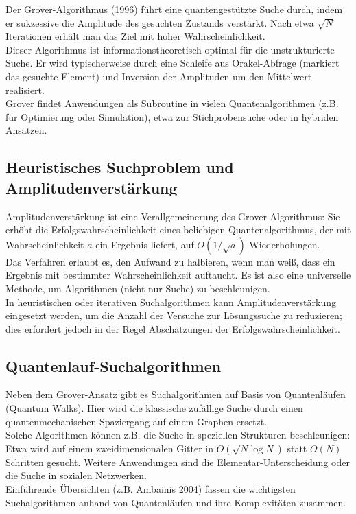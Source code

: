 Der Grover-Algorithmus (1996) führt eine quantengestützte Suche durch, indem er sukzessive die Amplitude des gesuchten Zustands verstärkt. Nach etwa $\sqrt{N}$ Iterationen erhält man das Ziel mit hoher Wahrscheinlichkeit.\\
Dieser Algorithmus ist informationstheoretisch optimal für die unstrukturierte Suche. Er wird typischerweise durch eine Schleife aus Orakel-Abfrage (markiert das gesuchte Element) und Inversion der Amplituden um den Mittelwert realisiert.\\
Grover findet Anwendungen als Subroutine in vielen Quantenalgorithmen (z.B. für Optimierung oder Simulation), etwa zur Stichprobensuche oder in hybriden Ansätzen.

\subsection{Heuristisches Suchproblem und Amplitudenverstärkung}

Amplitudenverstärkung ist eine Verallgemeinerung des Grover-Algorithmus: Sie erhöht die Erfolgswahrscheinlichkeit eines beliebigen Quantenalgorithmus, der mit Wahrscheinlichkeit $a$ ein Ergebnis liefert, auf $O(1/\sqrt{a})$ Wiederholungen.\\
Das Verfahren erlaubt es, den Aufwand zu halbieren, wenn man weiß, dass ein Ergebnis mit bestimmter Wahrscheinlichkeit auftaucht. Es ist also eine universelle Methode, um Algorithmen (nicht nur Suche) zu beschleunigen.\\
In heuristischen oder iterativen Suchalgorithmen kann Amplitudenverstärkung eingesetzt werden, um die Anzahl der Versuche zur Lösungssuche zu reduzieren; dies erfordert jedoch in der Regel Abschätzungen der Erfolgswahrscheinlichkeit.

\subsection{Quantenlauf-Suchalgorithmen}

Neben dem Grover-Ansatz gibt es Suchalgorithmen auf Basis von Quantenläufen (Quantum Walks). Hier wird die klassische zufällige Suche durch einen quantenmechanischen Spaziergang auf einem Graphen ersetzt.\\
Solche Algorithmen können z.B. die Suche in speziellen Strukturen beschleunigen: Etwa wird auf einem zweidimensionalen Gitter in $O(\sqrt{N\log N})$ statt $O(N)$ Schritten gesucht. Weitere Anwendungen sind die Elementar-Unterscheidung oder die Suche in sozialen Netzwerken.\\
Einführende Übersichten (z.B. Ambainis 2004) fassen die wichtigsten Suchalgorithmen anhand von Quantenläufen und ihre Komplexitäten zusammen.

